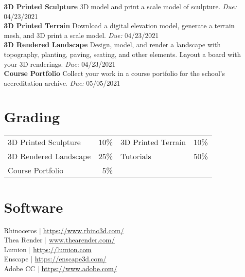 \documentclass[11pt,article,oneside]{memoir}
\begin{document}
\noindent \textbf{3D Printed Sculpture}
3D model and print a scale model of sculpture.
\emph{Due:} 04/23/2021\\

\noindent \textbf{3D Printed Terrain}
Download a digital elevation model, 
generate a terrain mesh, 
and 3D print a scale model. 
\emph{Due:} 04/23/2021\\

\noindent \textbf{3D Rendered Landscape}
Design, model, and render a landscape 
with topography, planting, paving, seating, and other elements. 
Layout a board with your 3D renderings. 
\emph{Due:} 04/23/2021\\

\noindent \textbf{Course Portfolio}
Collect your work in a course portfolio
for the school's accreditation archive.
\emph{Due:} 05/05/2021\\

\section{Grading}

\begin{table}[H]
\begin{tabular}{l r @{\hskip 2cm} l @{\hskip 0.5cm} l}
3D Printed Sculpture & 10\% &
3D Printed Terrain & 10\%\\
3D Rendered Landscape & 25\% & Tutorials & 50\%\\
Course Portfolio & 5\% \\
\end{tabular}
\end{table}

\section{Software}
\begin{multicols}{2}
\raggedright
Rhinoceros | \url{https://www.rhino3d.com/}\\
Thea Render | \url{www.thearender.com/}\\
Lumion | \url{https://lumion.com}\\
Enscape | \url{https://enscape3d.com/}\\
Adobe CC | \url{https://www.adobe.com/}\\
\end{multicols}
\end{document}

